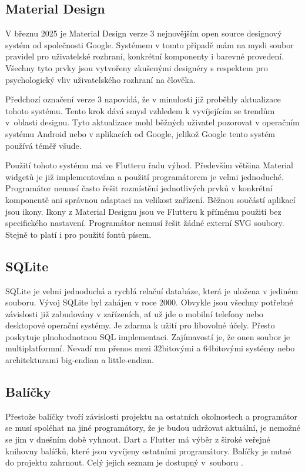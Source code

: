 \documentclass[
  biblatex,
  figures=true,
  tables=false,
  glossaries,
  index
]{kidiplom}
\begin{document}
\subsection{Material Design} \label{sec:material-design}
V březnu 2025 je Material Design verze 3 \cite{m3} nejnovějším open source designový systém od společnosti Google. Systémem v tomto případě mám na mysli soubor pravidel pro uživatelské rozhraní, konkrétní komponenty i barevné provedení. Všechny tyto prvky jsou vytvořeny zkušenými designéry s respektem pro psychologický vliv uživatelského rozhraní na člověka.

Předchozí označení verze 3 napovídá, že v minulosti již proběhly aktualizace tohoto systému. Tento krok dává smysl vzhledem k vyvíjejícím se trendům v~oblasti designu. Tyto aktualizace mohl běžných uživatel pozorovat v operačním systému Android nebo v aplikacích od Google, jelikož Google tento systém používá téměř všude.

Použití tohoto systému má ve Flutteru řadu výhod. Především většina Material widgetů je již implementována \cite{m3-components} a použití programátorem je velmi jednoduché. Programátor nemusí často řešit rozmístění jednotlivých prvků v konkrétní komponentě ani správnou adaptaci na velikost zařízení. Běžnou součástí aplikací jsou ikony. Ikony z Material Designu jsou ve Flutteru k přímému použití bez specifického nastavení. Programátor nemusí řešit žádné externí SVG soubory. Stejně to platí i pro použití fontů písem.

\subsection{SQLite}
SQLite \cite{sqlite} je velmi jednoduchá a rychlá relační databáze, která je uložena v jediném souboru. Vývoj SQLite byl zahájen v roce 2000. Obvykle jsou všechny potřebné závislosti již zabudovány v zařízeních, ať už jde o mobilní telefony nebo desktopové operační systémy. Je zdarma k užití pro libovolné účely. Přesto poskytuje plnohodnotnou SQL implementaci. Zajímavostí je, že onen soubor je multiplatformní. Nevadí mu přenos mezi 32bitovými a 64bitovými systémy nebo architekturami big-endian a little-endian.

\subsection{Balíčky}

Přestože balíčky tvoří závislosti projektu na ostatních okolnostech a programátor se musí spoléhat na jiné programátory, že je budou udržovat aktuální, je nemožné se jim v dnešním době vyhnout. Dart a Flutter má výběr z široké veřejné knihovny balíčků, které jsou vyvíjeny ostatními programátory. Balíčky je nutné do projektu zahrnout. Celý jejich seznam je dostupný v~souboru . 
\end{document}
